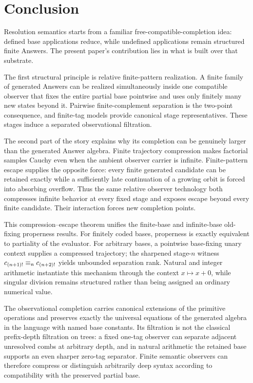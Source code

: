 \section{Conclusion}

Resolution semantics starts from a familiar free-compatible-completion idea:
defined base applications reduce, while undefined applications remain
structured finite Answers.  The present paper's contribution lies in what is
built over that substrate.

The first structural principle is relative finite-pattern realization.  A
finite family of generated Answers can be realized simultaneously inside one
compatible observer that fixes the entire partial base pointwise and uses only
finitely many new states beyond it.  Pairwise finite-complement separation is
the two-point consequence, and finite-tag models provide canonical stage
representatives.  These stages induce a separated observational filtration.

The second part of the story explains why its completion can be genuinely
larger than the generated Answer algebra.  Finite trajectory compression makes
factorial samples Cauchy even when the ambient observer carrier is infinite.
Finite-pattern escape supplies the opposite force: every finite generated
candidate can be retained exactly while a sufficiently late continuation of a
growing orbit is forced into absorbing overflow.  Thus the same relative
observer technology both compresses infinite behavior at every fixed stage and
exposes escape beyond every finite candidate.  Their interaction forces new
completion points.

This compression--escape theorem unifies the finite-base and infinite-base
old-fixing properness results.  For finitely coded bases, properness is exactly
equivalent to partiality of the evaluator.  For arbitrary bases, a pointwise
base-fixing unary context supplies a compressed trajectory; the sharpened
stage-$n$ witness $c_{(n+1)!}\mathrel{\equiv_{n}}c_{(n+2)!}$ yields unbounded separation
rank.  Natural and integer arithmetic instantiate this mechanism through the
context $x\mapsto x+0$, while singular division remains structured rather than
being assigned an ordinary numerical value.

The observational completion carries canonical extensions of the primitive
operations and preserves exactly the universal equations of the generated
algebra in the language with named base constants.  Its filtration is not the
classical prefix-depth filtration on trees: a fixed one-tag observer can
separate adjacent unresolved combs at arbitrary depth, and in natural
arithmetic the retained base supports an even sharper zero-tag separator.
Finite semantic observers can therefore compress or distinguish arbitrarily
deep syntax according to compatibility with the preserved partial base.

